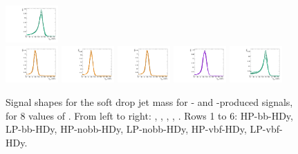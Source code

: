 \begin{figure}[htbp]
  \includegraphics[width=0.18\textwidth]{fig/2Dfit/templateSignalVsMX_fromDC_WprToWH_MJJ_mu_HP_vbf_HDy.pdf}\\
  \includegraphics[width=0.18\textwidth]{fig/2Dfit/templateSignalVsMX_fromDC_GbuToWW_MJJ_mu_LP_vbf_HDy.pdf}
  \includegraphics[width=0.18\textwidth]{fig/2Dfit/templateSignalVsMX_fromDC_RadToWW_MJJ_mu_LP_vbf_HDy.pdf}
  \includegraphics[width=0.18\textwidth]{fig/2Dfit/templateSignalVsMX_fromDC_ZprToWW_MJJ_mu_LP_vbf_HDy.pdf}
  \includegraphics[width=0.18\textwidth]{fig/2Dfit/templateSignalVsMX_fromDC_WprToWZ_MJJ_mu_LP_vbf_HDy.pdf}
  \includegraphics[width=0.18\textwidth]{fig/2Dfit/templateSignalVsMX_fromDC_WprToWH_MJJ_mu_LP_vbf_HDy.pdf}\\
  \caption{
    Signal shapes for the soft drop jet mass \MJ for \ggF- and \DY-produced signals, for 8 values of \MX.
    From left to right: \GBulktoWW, \RadtoWW, \ZprtoWW, \WprtoWZ, \WprtoWH.
    Rows 1 to 6: HP-bb-HDy, LP-bb-HDy, HP-nobb-HDy, LP-nobb-HDy, HP-vbf-HDy, LP-vbf-HDy.
  }
  \label{fig:MJJShapes_NonVBF_HDy_Run2}
\end{figure}

